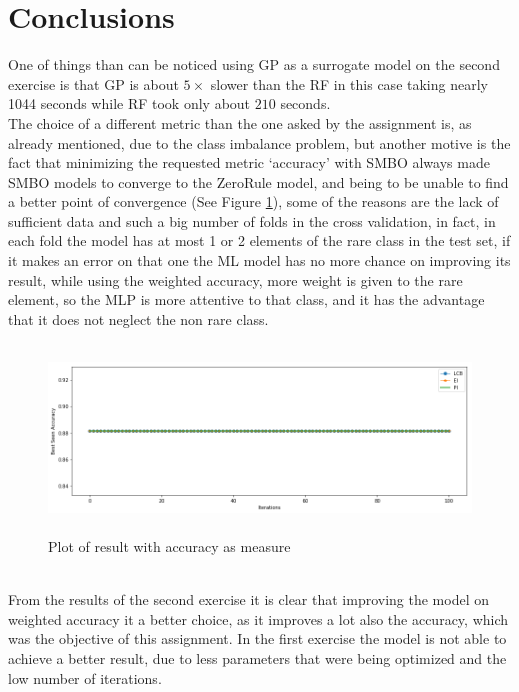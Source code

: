 \documentclass[12pt, onecolumn]{article}
\begin{document}
\section*{Conclusions}
One of things than can be noticed using GP as a surrogate model on the second exercise is that GP is about $5\times$ slower than the RF in this case taking nearly 1044 seconds while RF took only about $210$ seconds.\\
The choice of a different metric than the one asked by the assignment is, as already mentioned, due to the class imbalance problem, but another motive is the fact that minimizing the requested metric `accuracy' with SMBO always made SMBO models to converge to the ZeroRule model, and being to be unable to find a better point of convergence (See Figure \ref{fig:second_acc}), some of the reasons are the lack of sufficient data and such a big number of folds in the cross validation, in fact, in each fold the model has at most 1 or 2 elements of the rare class in the test set, if it makes an error on that one the ML model has no more chance on improving its result, while using the weighted accuracy, more weight is given to the rare element, so the MLP is more attentive to that class, and it has the advantage that it does not neglect the non rare class.    
\begin{figure}[!h]
  \centering
  \includegraphics[width=\linewidth, height=5cm]{imgs/second_comparision_accuracy.png}
  \caption{Plot of result with accuracy as measure}
  \label{fig:second_acc}
\end{figure}\\
From the results of the second exercise it is clear that improving the model on weighted accuracy it a better choice, as it improves a lot also the accuracy, which was the objective of this assignment.
In the first exercise the model is not able to achieve a better result, due to less parameters that were being optimized and the low number of iterations.\\
\end{document}
